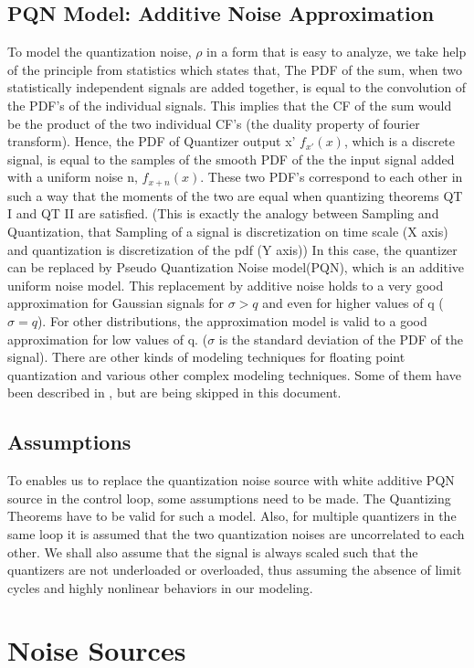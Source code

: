 \documentclass[colorlinks=true,pdfstartview=FitV,linkcolor=blue,
            citecolor=red,urlcolor=magenta]{ligodoc}
\begin{document}
\subsection{PQN Model: Additive Noise Approximation} To model the quantization noise, $\rho$ in a form that is easy to analyze, we take help of the principle from statistics which states that, The PDF of the sum, when two statistically independent signals are added together, is equal to the convolution of the PDF's of the individual signals. This implies that the CF of the sum would be the product of the two individual CF's (the duality property of fourier transform).
Hence, the PDF of Quantizer output x' $f_{x'}(x)$, which is a discrete signal, is equal to the samples of the smooth PDF of the the input signal added with a uniform noise n, $f_{x+n}(x)$. These two PDF's correspond to each other in such a way that the moments of the two are equal when quantizing theorems QT I and QT II are satisfied. (This is exactly the analogy between Sampling and Quantization, that Sampling of a signal is discretization on time scale (X axis) and quantization is discretization of the pdf (Y axis)) In this case, the quantizer can be replaced by Pseudo Quantization Noise model(PQN), which is an additive uniform noise model. This replacement by additive noise holds to a very good approximation for Gaussian signals for $\sigma > q$ and even for higher values of q ($\sigma = q$). For other distributions, the approximation model is valid to a good approximation for low values of q. ($\sigma$ is the standard deviation of the PDF of the signal). There are other kinds of modeling techniques for floating point quantization and various other complex modeling techniques. Some of them have been described in \cite{Kollar}, but are being skipped in this document. 
	\subsection{Assumptions}
To enables us to replace the quantization noise source with white additive PQN source in the control loop, some assumptions need to be made. The Quantizing Theorems have to be valid for such a model. Also, for multiple quantizers in the same loop it is assumed that the two quantization noises are uncorrelated to each other.
We shall also assume that the signal is always scaled such that the quantizers are not underloaded or overloaded, thus assuming the absence of limit cycles and highly nonlinear behaviors in our modeling.


\section{Noise Sources}
\end{document}
